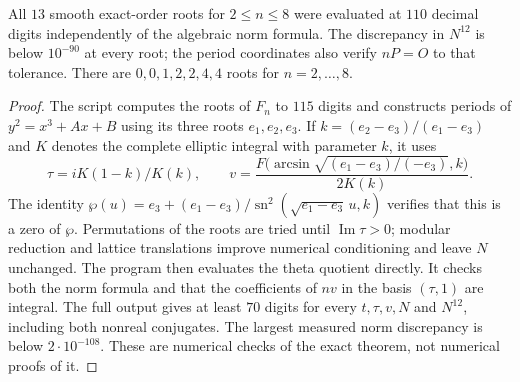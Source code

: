 \begin{proposition}\label{ari:C.4.5}
All $13$ smooth exact-order roots for $2\le n\le8$ were evaluated
at $110$ decimal digits independently of the algebraic norm formula.
The discrepancy in $N^{12}$ is below $10^{-90}$ at every root;
the period coordinates also verify $nP=O$ to that tolerance.
There are $0,0,1,2,2,4,4$ roots for $n=2,\ldots,8$.
\end{proposition}
\begin{proof}
The script  computes the
roots of $F_n$ to $115$ digits and constructs periods of
$y^2=x^3+Ax+B$ using its three roots $e_1,e_2,e_3$. If
$k=(e_2-e_3)/(e_1-e_3)$ and $K$ denotes the complete elliptic
integral with parameter $k$, it uses
\[
 \tau=iK(1-k)/K(k),\qquad
 v=\frac{F\bigl(\arcsin\sqrt{(e_1-e_3)/(-e_3)},k\bigr)}{2K(k)}.
\]
The identity
$\wp(u)=e_3+(e_1-e_3)/\operatorname{sn}^2
(\sqrt{e_1-e_3}\,u,k)$ verifies that this is a zero of $\wp$.
Permutations of the roots are tried until $\operatorname{Im}\tau>0$;
modular reduction and lattice translations improve numerical
conditioning and leave $N$ unchanged. The program then evaluates
the theta quotient directly. It checks both the norm formula and
that the coefficients of $nv$ in the basis $(\tau,1)$ are integral.
The full output gives at least $70$ digits for every $t,\tau,v,N$
and $N^{12}$, including both nonreal conjugates. The largest measured
norm discrepancy is below $2\cdot10^{-108}$. These are numerical
checks of the exact theorem, not numerical proofs of it.
\end{proof}

